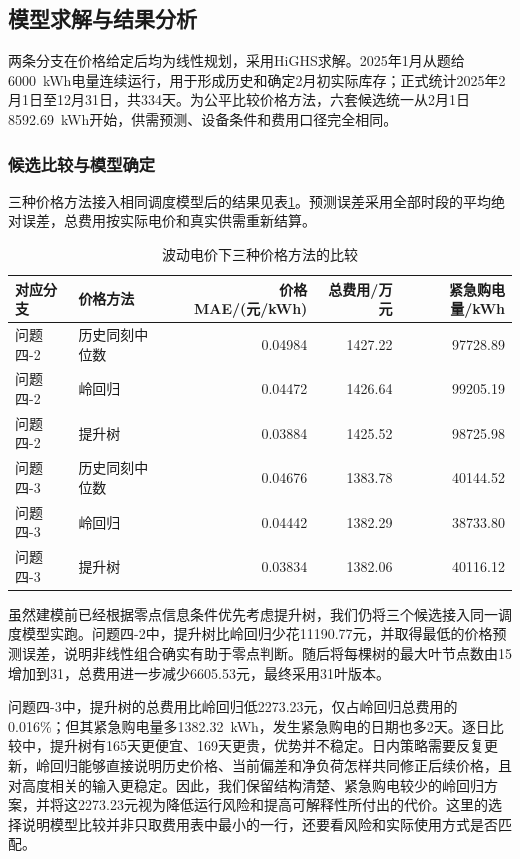 \documentclass[11pt,a4paper]{article}
\begin{document}
\subsection{模型求解与结果分析}

两条分支在价格给定后均为线性规划，采用HiGHS求解。2025年1月从题给6000~kWh电量连续运行，用于形成历史和确定2月初实际库存；正式统计2025年2月1日至12月31日，共334天。为公平比较价格方法，六套候选统一从2月1日8592.69~kWh开始，供需预测、设备条件和费用口径完全相同。

\subsubsection{候选比较与模型确定}

三种价格方法接入相同调度模型后的结果见表\ref{tab:q4compare}。预测误差采用全部时段的平均绝对误差，总费用按实际电价和真实供需重新结算。

\begin{table}[htbp]
\centering\small
\caption{波动电价下三种价格方法的比较}
\label{tab:q4compare}
\begin{tabular}{llrrr}
\toprule
对应分支 & 价格方法 & 价格MAE/(元/kWh) & 总费用/万元 & 紧急购电量/kWh \\
\midrule
问题四-2 & 历史同刻中位数 & 0.04984 & 1427.22 & 97728.89 \\
问题四-2 & 岭回归 & 0.04472 & 1426.64 & 99205.19 \\
问题四-2 & 提升树 & 0.03884 & 1425.52 & 98725.98 \\
问题四-3 & 历史同刻中位数 & 0.04676 & 1383.78 & 40144.52 \\
问题四-3 & 岭回归 & 0.04442 & 1382.29 & 38733.80 \\
问题四-3 & 提升树 & 0.03834 & 1382.06 & 40116.12 \\
\bottomrule
\end{tabular}
\end{table}

虽然建模前已经根据零点信息条件优先考虑提升树，我们仍将三个候选接入同一调度模型实跑。问题四-2中，提升树比岭回归少花11190.77元，并取得最低的价格预测误差，说明非线性组合确实有助于零点判断。随后将每棵树的最大叶节点数由15增加到31，总费用进一步减少6605.53元，最终采用31叶版本。

问题四-3中，提升树的总费用比岭回归低2273.23元，仅占岭回归总费用的0.016\%；但其紧急购电量多1382.32~kWh，发生紧急购电的日期也多2天。逐日比较中，提升树有165天更便宜、169天更贵，优势并不稳定。日内策略需要反复更新，岭回归能够直接说明历史价格、当前偏差和净负荷怎样共同修正后续价格，且对高度相关的输入更稳定。因此，我们保留结构清楚、紧急购电较少的岭回归方案，并将这2273.23元视为降低运行风险和提高可解释性所付出的代价。这里的选择说明模型比较并非只取费用表中最小的一行，还要看风险和实际使用方式是否匹配。
\end{document}
